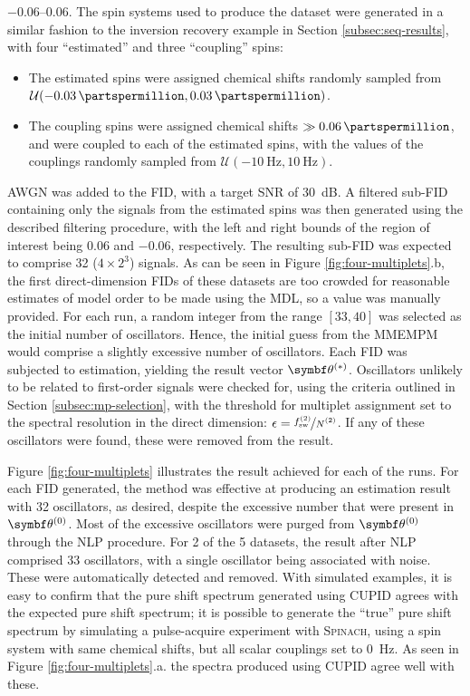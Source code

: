 \SIrange{-0.06}{0.06}{\partspermillion}. The spin systems used to produce the
dataset were generated in a similar fashion to the inversion recovery example
in Section \ref{subsec:seq-results}, with four ``estimated'' and three
``coupling'' spins:
\begin{itemize}
    \item The estimated spins were assigned chemical shifts randomly
        sampled from $\mathcal{U}(\qty{-0.03}{\partspermillion},
        \qty{0.03}{\partspermillion})$.
    \item The coupling spins were assigned chemical shifts $\gg
        \qty{0.06}{\partspermillion}$, and were coupled to each of the
        estimated spins, with the values of the couplings randomly sampled from
        $\mathcal{U}(\qty{-10}{\hertz}, \qty{10}{\hertz})$.
\end{itemize}
\ac{AWGN} was added to the \ac{FID}, with a target \ac{SNR} of \qty{30}{\deci\bel}.
A filtered sub-\ac{FID} containing only the signals from the estimated spins
was then generated using the described filtering procedure, with the left and
right bounds of the region of interest being \qty{0.06}{\partspermillion} and
\qty{-0.06}{\partspermillion}, respectively.
The resulting sub-\ac{FID} was expected to comprise 32 ($4 \times
2^3$) signals. As can be seen in Figure
\ref{fig:four-multiplets}.b, the first direct-dimension \acp{FID} of these
datasets are too crowded for reasonable estimates of model order to be made
using the \ac{MDL}, so a value was manually provided. For each run, a random
integer from the range $[33, 40]$ was selected as the initial number of
oscillators. Hence, the initial guess from the \ac{MMEMPM} would comprise a
slightly excessive number of oscillators. Each \ac{FID} was subjected to
estimation, yielding the result vector $\bthstar$. Oscillators unlikely to be
related to first-order signals were checked for, using the criteria outlined in
Section \ref{subsec:mp-selection}, with the threshold for multiplet assignment
set to the spectral resolution in the direct dimension: $\epsilon =
\nicefrac{f_{\text{sw}}^{(2)}}{\Ntwo}$. If any of these oscillators were found,
these were removed from the result.

Figure \ref{fig:four-multiplets} illustrates the result achieved for each of
the runs. For each \ac{FID} generated, the method was effective at producing an
estimation result with 32 oscillators, as desired, despite the excessive number
that were present in $\bthzero$. Most of the excessive oscillators were purged
from $\bthzero$ through the \ac{NLP} procedure.
For 2 of the 5 datasets, the result after \ac{NLP} comprised 33
oscillators, with a single oscillator being associated with noise. These were
automatically detected and removed. With simulated examples, it is easy to
confirm that the pure shift spectrum generated using \ac{CUPID} agrees with the
expected pure shift spectrum; it is possible to generate the ``true'' pure shift
spectrum by simulating a pulse-acquire experiment with \textsc{Spinach}, using
a spin system with same chemical shifts, but all scalar couplings set to
\qty{0}{\hertz}.
As seen in Figure \ref{fig:four-multiplets}.a. the spectra produced
using \ac{CUPID} agree well with these.

